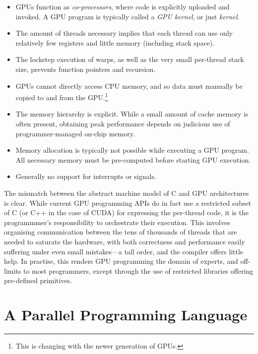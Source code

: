 \begin{itemize}
\item GPUs function as \textit{co-processors}, where code is
  explicitly uploaded and invoked.  A GPU program is typically called
  a \textit{GPU kernel}, or just \textit{kernel}.
\item The amount of threads necessary implies that each thread can use
  only relatively few registers and little memory (including stack
  space).
\item The lockstep execution of warps, as well as the very small
  per-thread stack size, prevents function pointers and recursion.
\item GPUs cannot directly access CPU memory, and so data must
  manually be copied to and from the GPU.\footnote{This is changing
    with the newer generation of GPUs.}
\item The memory hierarchy is explicit.  While a small amount of cache
  memory is often present, obtaining peak performance depends on
  judicious use of programmer-managed on-chip memory.
\item Memory allocation is typically not possible while executing a
  GPU program.  All necessary memory must be pre-computed before
  starting GPU execution.
\item Generally no support for interrupts or signals.
\end{itemize}

The mismatch between the abstract machine model of C and GPU
architectures is clear.  While current GPU programming APIs do in fact
use a restricted subset of C (or C++ in the case of CUDA) for
expressing the per-thread code, it is the programmmer's responsibility
to orchestrate their execution.  This involves organising
communication between the tens of thousands of threads that are needed
to saturate the hardware, with both correctness and performance easily
suffering under even small mistakes---a tall order, and the compiler
offers little help.  In practise, this renders GPU programming the
domain of experts, and off-limits to most programmers, except through
the use of restricted libraries offering pre-defined primitives.

\section{A Parallel Programming Language}
\label{sec:a-parallel-programming-language}

